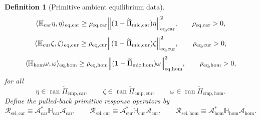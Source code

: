 \documentclass[11pt]{article}
\newcommand{\TensorResp}{\mathcal R_{\mathrm{sel,car}}}
\newcommand{\CurResp}{\mathcal R_{\mathrm{sel,cur}}}
\newcommand{\HomResp}{\mathcal R_{\mathrm{sel,hom}}}
\newcommand{\TensorEqRead}{\mathcal A_{\mathrm{car}}}
\newcommand{\CurEqRead}{\mathcal A_{\mathrm{cur}}}
\newcommand{\HomEqRead}{\mathcal A_{\mathrm{hom}}}
\newcommand{\TensorAmbientHess}{\mathbb H_{\mathrm{car}}}
\newcommand{\CurAmbientHess}{\mathbb H_{\mathrm{cur}}}
\newcommand{\HomAmbientHess}{\mathbb H_{\mathrm{hom}}}
\newcommand{\TensorEqCmpProj}{\widetilde\Pi_{\mathrm{cmp,car}}}
\newcommand{\CurEqCmpProj}{\widetilde\Pi_{\mathrm{cmp,cur}}}
\newcommand{\HomEqCmpProj}{\widetilde\Pi_{\mathrm{cmp,hom}}}
\newcommand{\TensorEqKerProj}{\widetilde\Pi_{\mathrm{mic,car}}}
\newcommand{\CurEqKerProj}{\widetilde\Pi_{\mathrm{mic,cur}}}
\newcommand{\HomEqKerProj}{\widetilde\Pi_{\mathrm{mic,hom}}}
\newcommand{\EqCarGap}{\rho_{\mathrm{eq,car}}}
\newcommand{\EqCurGap}{\rho_{\mathrm{eq,cur}}}
\newcommand{\EqHomGap}{\rho_{\mathrm{eq,hom}}}
\newtheorem{definition}{Definition}
\begin{document}
\begin{definition}[Primitive ambient equilibrium data]
\begin{equation}
\langle \TensorAmbientHess\eta,\eta\rangle_{\mathrm{eq,car}}
\ge
\EqCarGap\norm{(\mathbf 1-\TensorEqKerProj)\eta}_{\mathrm{eq,car}}^2,
\qquad
\EqCarGap>0,
\label{eq:ambient_gap_car}
\end{equation}
\begin{equation}
\langle \CurAmbientHess\zeta,\zeta\rangle_{\mathrm{eq,cur}}
\ge
\EqCurGap\norm{(\mathbf 1-\CurEqKerProj)\zeta}_{\mathrm{eq,cur}}^2,
\qquad
\EqCurGap>0,
\label{eq:ambient_gap_cur}
\end{equation}
\begin{equation}
\langle \HomAmbientHess\omega,\omega\rangle_{\mathrm{eq,hom}}
\ge
\EqHomGap\norm{(\mathbf 1-\HomEqKerProj)\omega}_{\mathrm{eq,hom}}^2,
\qquad
\EqHomGap>0,
\label{eq:ambient_gap_hom}
\end{equation}
for all
\[
\eta\in\operatorname{ran}\TensorEqCmpProj,\qquad
\zeta\in\operatorname{ran}\CurEqCmpProj,\qquad
\omega\in\operatorname{ran}\HomEqCmpProj.
\]
Define the pulled-back primitive response operators by
\begin{equation}
\TensorResp\equiv\TensorEqRead^*\TensorAmbientHess\TensorEqRead,
\qquad
\CurResp\equiv\CurEqRead^*\CurAmbientHess\CurEqRead,
\qquad
\HomResp\equiv\HomEqRead^*\HomAmbientHess\HomEqRead.
\label{eq:response_from_ambient}
\end{equation}
\end{definition}
\end{document}
